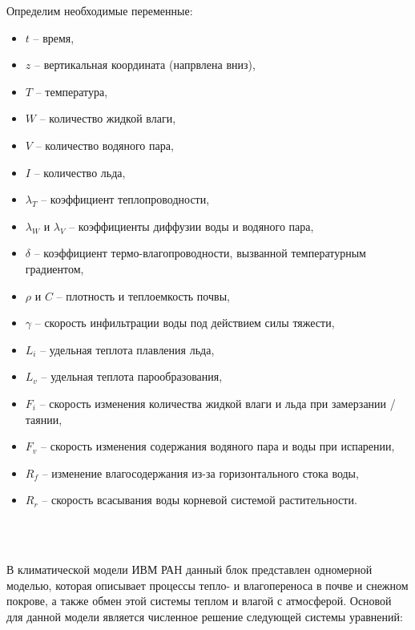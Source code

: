\documentclass[a4paper, fontsize=14pt]{scrartcl}
\begin{document}
\newpage
Определим необходимые переменные:
\begin{itemize}
    \item $t$ -- время, 
    \item $z$ -- вертикальная координата (напрвлена вниз), 
    \item $T$ -- температура, 
    \item $W$ -- количество жидкой влаги, 
    \item $V$ -- количество водяного пара, 
    \item $I$ -- количество льда, 
    \item $\lambda_T$ -- коэффициент теплопроводности, 
    \item $\lambda_W$ и $\lambda_V$ -- коэффициенты диффузии воды и водяного пара, 
    \item $\delta$ -- коэффициент термо-влагопроводности, вызванной температурным градиентом, 
    \item $\rho$ и $C$ -- плотность и теплоемкость почвы, 
    \item $\gamma$ -- скорость инфильтрации воды под действием силы тяжести, 
    \item $L_i$ -- удельная теплота плавления льда, 
    \item $L_v$ -- удельная теплота парообразования, 
    \item $F_i$ -- скорость изменения количества жидкой влаги и льда при замерзании / таянии, 
    \item $F_v$ -- скорость изменения содержания водяного пара и воды при испарении, 
    \item $R_f$ -- изменение влагосодержания из-за горизонтального стока воды, 
    \item $R_r$ -- скорость всасывания воды корневой системой растительности.
\end{itemize} 

\\ ~

В климатической модели ИВМ РАН данный блок представлен одномерной моделью, которая описывает процессы тепло- и влагопереноса в почве и снежном покрове, а также обмен этой системы теплом и влагой с атмосферой. Основой для данной модели является численное решение следующей системы уравнений:
\end{document}
